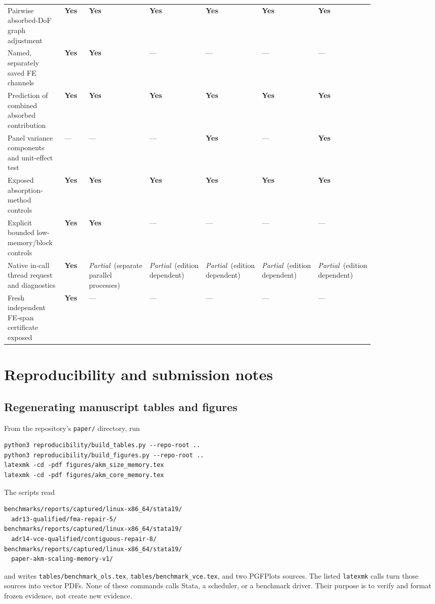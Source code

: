 \documentclass[11pt]{article}
\newcommand{\yes}{\textbf{Yes}}
\newcommand{\partialyes}{\textit{Partial}}
\newcommand{\no}{---}
\begin{document}
\begin{landscape}
\begin{center}
\begin{longtable}{P{0.19\linewidth}
  P{0.105\linewidth}P{0.12\linewidth}
  P{0.105\linewidth}P{0.105\linewidth}
  P{0.105\linewidth}P{0.105\linewidth}}
Pairwise absorbed-DoF graph adjustment
  & \yes & \yes & \yes & \yes & \yes & \yes \\
Named, separately saved FE channels
  & \yes & \yes & \no & \no & \no & \no \\
Prediction of combined absorbed contribution
  & \yes & \yes & \yes & \yes & \yes & \yes \\
Panel variance components and unit-effect test
  & \no & \no & \no & \yes & \no & \yes \\
Exposed absorption-method controls
  & \yes & \yes & \yes & \yes & \yes & \yes \\
Explicit bounded low-memory/block controls
  & \yes & \yes & \no & \no & \no & \no \\
Native in-call thread request and diagnostics
  & \yes & \partialyes\ (separate parallel processes)
  & \partialyes\ (edition dependent) & \partialyes\ (edition dependent)
  & \partialyes\ (edition dependent) & \partialyes\ (edition dependent) \\
Fresh independent FE-span certificate exposed
  & \yes & \no & \no & \no & \no & \no \\
\end{longtable}
\end{center}
\end{landscape}

\section{Reproducibility and submission notes}
\label{app:reproducibility}

\subsection{Regenerating manuscript tables and figures}

From the repository's \texttt{paper/} directory, run
\begin{verbatim}
python3 reproducibility/build_tables.py --repo-root ..
python3 reproducibility/build_figures.py --repo-root ..
latexmk -cd -pdf figures/akm_size_memory.tex
latexmk -cd -pdf figures/akm_core_memory.tex
\end{verbatim}
The scripts read
\begin{verbatim}
benchmarks/reports/captured/linux-x86_64/stata19/
  adr13-qualified/fma-repair-5/
benchmarks/reports/captured/linux-x86_64/stata19/
  adr14-vce-qualified/contiguous-repair-8/
benchmarks/reports/captured/linux-x86_64/stata19/
  paper-akm-scaling-memory-v1/
\end{verbatim}
and writes \texttt{tables/benchmark\_ols.tex},
\texttt{tables/benchmark\_vce.tex}, and two PGFPlots sources.  The listed
\texttt{latexmk} calls turn those sources into vector PDFs.  None of these
commands calls Stata, a scheduler, or a benchmark driver.  Their purpose is to
verify and format frozen evidence, not create new evidence.
\end{document}
